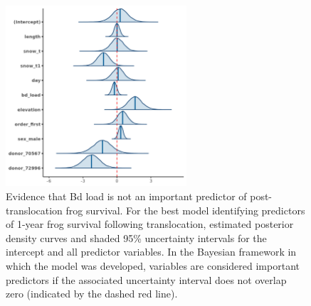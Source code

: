 \documentclass[9pt,twoside,lineno]{pnas-new}
\begin{document}
\begin{figure}

{\centering \includegraphics[width=0.60\textwidth]{figures/mcmc_areas_m1d.png}

}

\caption{\label{fig-survival-postdens}Evidence that Bd load is not an
important predictor of post-translocation frog survival. For the best
model identifying predictors of 1-year frog survival following
translocation, estimated posterior density curves and shaded 95\%
uncertainty intervals for the intercept and all predictor variables. In
the Bayesian framework in which the model was developed, variables are
considered important predictors if the associated uncertainty interval
does not overlap zero (indicated by the dashed red line).}

\end{figure}\clearpage
\end{document}
